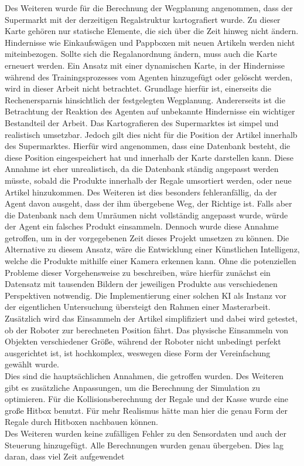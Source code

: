 Des Weiteren wurde für die Berechnung der Wegplanung angenommen, dass der Supermarkt mit der derzeitigen Regalstruktur kartografiert wurde. Zu dieser Karte gehören nur statische Elemente, die sich über die Zeit hinweg nicht ändern. Hindernisse wie Einkaufswägen und Pappboxen mit neuen Artikeln werden nicht miteinbezogen. Sollte sich die Regalanordnung ändern, muss auch die Karte erneuert werden. Ein Ansatz mit einer dynamischen Karte, in der Hindernisse während des Trainingsprozesses vom Agenten hinzugefügt oder gelöscht werden, wird in dieser Arbeit nicht betrachtet. Grundlage hierfür ist, einerseits die Rechenersparnis hinsichtlich der festgelegten Wegplanung. Andererseits ist die Betrachtung der Reaktion des Agenten auf unbekannte Hindernisse ein wichtiger Bestandteil der Arbeit. Das Kartografieren des Supermarktes ist simpel und realistisch umsetzbar. Jedoch gilt dies nicht für die Position der Artikel innerhalb des Supermarktes. Hierfür wird angenommen, dass eine Datenbank besteht, die diese Position eingespeichert hat und innerhalb der Karte darstellen kann. Diese Annahme ist eher unrealistisch, da die Datenbank ständig angepasst werden müsste, sobald die Produkte innerhalb der Regale umsortiert werden, oder neue Artikel hinzukommen. Des Weiteren ist dies besonders fehleranfällig, da der Agent davon ausgeht, dass der ihm übergebene Weg, der Richtige ist. Falls aber die Datenbank nach dem Umräumen nicht vollständig angepasst wurde, würde der Agent ein falsches Produkt einsammeln. Dennoch wurde diese Annahme getroffen, um in der vorgegebenen Zeit dieses Projekt umsetzen zu können. Die Alternative zu diesem Ansatz, wäre die Entwicklung einer Künstlichen Intelligenz, welche die Produkte mithilfe einer Kamera erkennen kann. Ohne die potenziellen Probleme dieser Vorgehensweise zu beschreiben, wäre hierfür zunächst ein Datensatz mit tausenden Bildern der jeweiligen Produkte aus verschiedenen Perspektiven notwendig. Die Implementierung einer solchen KI als Instanz vor der eigentlichen Untersuchung übersteigt den Rahmen einer Masterarbeit. 
\\
Zusätzlich wird das Einsammeln der Artikel simplifiziert und dabei wird getestet, ob der Roboter zur berechneten Position fährt. Das physische Einsammeln von Objekten verschiedener Größe, während der Roboter nicht unbedingt perfekt ausgerichtet ist, ist hochkomplex, weswegen diese Form der Vereinfachung gewählt wurde.
\\
Dies sind die hauptsächlichen Annahmen, die getroffen wurden. Des Weiteren gibt es zusätzliche Anpassungen, um die Berechnung der Simulation zu optimieren. Für die Kollisionsberechnung der Regale und der Kasse wurde eine große Hitbox benutzt. Für mehr Realismus hätte man hier die genau Form der Regale durch Hitboxen nachbauen können. 
\\
Des Weiteren wurden keine zufälligen Fehler zu den Sensordaten und auch der Steuerung hinzugefügt. Alle Berechnungen wurden genau übergeben. Dies lag daran, dass viel Zeit aufgewendet

